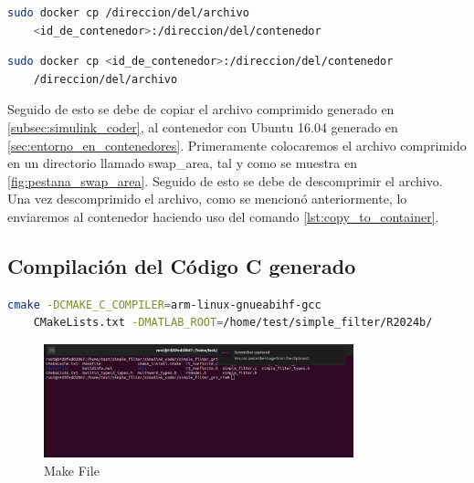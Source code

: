 \begin{lstlisting}[language=bash, caption={Copiar archivos al contenedor, Linux}, label=lst:copy_to_container]
    sudo docker cp /direccion/del/archivo 
    <id_de_contenedor>:/direccion/del/contenedor
\end{lstlisting}

\begin{lstlisting}[language=bash, caption={Copiar archivos del contenedor, Linux}, label=lst:copy_from_container]
    sudo docker cp <id_de_contenedor>:/direccion/del/contenedor
    /direccion/del/archivo
\end{lstlisting}

Seguido de esto se debe de copiar el archivo comprimido generado en \ref{subsec:simulink_coder}, al contenedor con Ubuntu 16.04 generado en \ref{sec:entorno_en_contenedores}. Primeramente colocaremos el archivo comprimido en un directorio llamado swap\_area, tal y como se muestra en \ref{fig:pestana_swap_area}. Seguido de esto se debe de descomprimir el archivo. Una vez descomprimido el archivo, como se mencionó anteriormente, lo enviaremos al contenedor haciendo uso del comando \ref{lst:copy_to_container}.

\subsection{Compilación del Código C generado}\label{subsec:compilacion_binario}

\begin{lstlisting}[language=bash, caption={Compilacion del programa, Linux}, label=lst:build_cmake_file]
    cmake -DCMAKE_C_COMPILER=arm-linux-gnueabihf-gcc 
    CMakeLists.txt -DMATLAB_ROOT=/home/test/simple_filter/R2024b/
\end{lstlisting}

\begin{figure}[h!]
    \centering
    \includegraphics[width=0.8\textwidth]{fig/especifico_2/M2MT/paso_a_paso_mtmt/cmake_file.pdf}
    \caption{Make File}
    \label{fig:make_file}
\end{figure}


